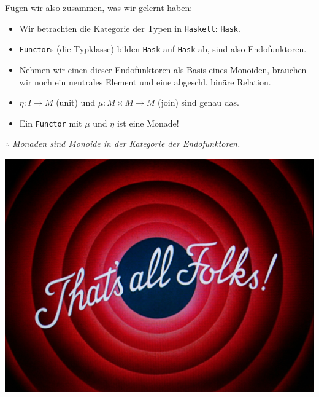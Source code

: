 \documentclass{beamer}
\begin{document}
\begin{frame}

Fügen wir also zusammen, was wir gelernt haben:

\begin{itemize}
\pause\item Wir betrachten die Kategorie der Typen in \texttt{Haskell}: \texttt{Hask}.
\pause\item \texttt{Functor}s (die Typklasse) bilden \texttt{Hask} auf \texttt{Hask} ab, sind also Endofunktoren. 
\pause\item Nehmen wir einen dieser Endofunktoren als Basis eines Monoiden, brauchen wir noch ein neutrales Element und eine abgeschl. binäre Relation.
\pause\item $\eta : I \to M$ (unit) und $\mu : M \times M \to M$ (join) sind genau das.
\pause\item Ein \texttt{Functor} mit $\mu$ und $\eta$ ist eine Monade!
\end{itemize}

\pause\bigskip
\begin{center}
$\therefore$ \textit{\glqq Monaden sind Monoide in der Kategorie der Endofunktoren.\grqq}
\end{center}

\end{frame}


\begin{frame}
\begin{center}
\includegraphics[scale=0.25]{thatsall.jpg} 
\end{center}
\end{frame}
\end{document}

